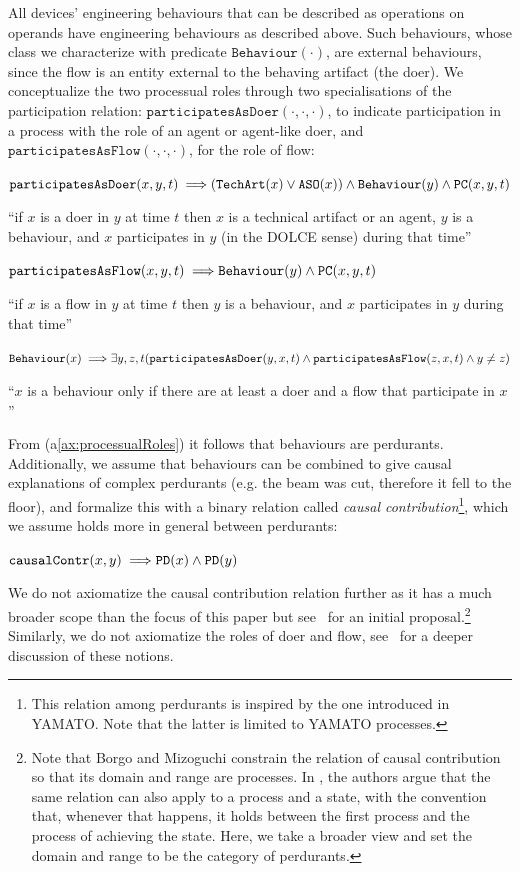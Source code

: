 \documentclass[sw]{iosart2x}
\newcommand{\bflist}{\begin{list}{}{\setlength{\topsep}{2mm}\setlength{\partopsep}{0mm}\setlength{\parsep}{0mm}\setlength{\leftmargin}{9mm}\setlength{\labelwidth}{8mm}}}
\newcommand{\eflist}{\end{list}}
\newcommand{\AxLabel}{\textrm{a}}
\newcounter{cntax}
\newcommand{\myax}[1]{\refstepcounter{cntax}\begin{small}{\bf \AxLabel\thecntax\label{ax:#1}}\end{small}}
\newcommand{\mytext}[1]{``#1''}
\newcommand{\refax}[1]{({\AxLabel}\ref{#1})}
\newcommand{\generalStyle}[1]{\texttt{#1}}
\newcommand{\biRel}[3]{\generalStyle{#1}(#2,#3)}
\newcommand{\uniRel}[2]{\generalStyle{#1}(#2)}
\newcommand{\triRel}[4]{\generalStyle{#1}(#2,#3,#4)}
\newcommand{\myfi}{\hspace{0.9mm} \Longrightarrow}
\newcommand{\DOLCE}{\textsc{DOLCE}\xspace} %
\newcommand{\YAMATO}{\textsc{YAMATO}\xspace}
\newcommand{\DOLCEAgent}[1]{\uniRel{{ASO}}{#1}}
\newcommand{\DOLCEPerdurant}[1]{\uniRel{{PD}}{#1}}
\newcommand{\DOLCEPC}[3]{\triRel{{PC}}{#1}{#2}{#3}}
\newcommand{\TechArt}[1]{\uniRel{TechArt}{#1}}
\newcommand{\BehaviourConcrete}[1]{\uniRel{Behaviour}{#1}}
\newcommand{\causallyContr}[2]{\biRel{causalContr}{#1}{#2}}
\newcommand{\participateAsDoer}[3]{\triRel{participatesAsDoer}{#1}{#2}{#3}}
\newcommand{\participateAsFlow}[3]{\triRel{participatesAsFlow}{#1}{#2}{#3}}
\newcommand{\firstTimeKeyWord}[1]{\textit{#1}}
\begin{document}
All devices' engineering behaviours that can be described as operations on operands have engineering behaviours as described above. 
Such behaviours, whose class we characterize with predicate $\BehaviourConcrete{\cdot}$, are external behaviours, since the flow is an entity external to the behaving artifact (the doer).
We conceptualize the two processual roles through two specialisations of the participation relation: $\participateAsDoer{\cdot}{\cdot}{\cdot}$, to indicate participation in a process with the role of an agent or agent-like doer, and $\participateAsFlow{\cdot}{\cdot}{\cdot}$, for the role of flow: 
\bflist
  \item[\myax{participateAsDoerRage}]  $ \participateAsDoer{x}{y}{t} \myfi (\TechArt{x} \lor \DOLCEAgent{x} ) \land \BehaviourConcrete{y} \land \DOLCEPC{x}{y}{t}$
\item \mytext{if $x$ is a doer in $y$ at time $t$ then $x$ is a technical artifact or an agent, $y$ is a behaviour, and $x$ participates in $y$ (in the \DOLCE sense) during that time}
  \item[\myax{participateAsFlowRage}]  $ \participateAsFlow{x}{y}{t} \myfi \BehaviourConcrete{y} \land \DOLCEPC{x}{y}{t}$
\item \mytext{if $x$ is a flow in $y$ at time $t$ then $y$ is a behaviour, and $x$ participates in $y$ during that time}
\item[\myax{processualRoles}] $ \BehaviourConcrete{x} \myfi \exists y,z,t(\participateAsDoer{y}{x}{t} \land \participateAsFlow{z}{x}{t} \land y \neq z) $ 
\item \mytext{$x$ is a behaviour only if there are at least a doer and a flow that participate in $x$}
\eflist

From \refax{ax:processualRoles} it follows that behaviours are perdurants. Additionally, we assume that behaviours can be combined to give causal explanations of complex perdurants (e.g. the beam was cut, therefore it fell to the floor), and formalize this with a binary relation called \firstTimeKeyWord{causal contribution}\footnote{This relation among perdurants is inspired by the one introduced in \YAMATO \cite{mizoguchiYAMATOAnotherMore}. Note that the latter is limited to \YAMATO processes.}, which we assume holds more in general between perdurants:
\bflist
  \item[\myax{contribRange}] $ \causallyContr{x}{y} \myfi \DOLCEPerdurant{x} \land \DOLCEPerdurant{y} $
\eflist

We do not axiomatize the causal contribution relation further as it has a much broader scope than the focus of this paper but see~\cite{borgoFirstorderFormalizationEvent2014} for an initial proposal.\footnote{Note that Borgo and Mizoguchi constrain the relation of causal contribution so that its domain and range are processes. In \cite{mizoguchiUnifyingDefinitionArtifact2016}, the authors argue that the same relation can also apply to a process and a state, with the convention that, whenever that happens, it holds between the first process and the process of achieving the state.
Here, we take a broader view and set the domain and range to be the category of perdurants.}
Similarly, we do not axiomatize the roles of doer and flow, see~\cite{loebeAbstractVsSocial2007} for a deeper discussion of these notions.
\end{document}
